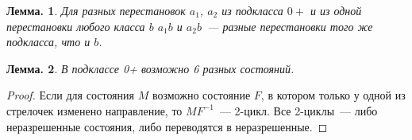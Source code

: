 \documentclass[utf8,russian]{beamer}
\newtheorem{ru_theo}{Лемма.}
\renewenvironment{theorem}{\begin{ru_theo}}{\end{ru_theo}}
\begin{document}

\begin{frame}
\begin{theorem}
Для разных перестановок $a_1$, $a_2$ из подкласса $0+$ и из одной перестановки любого класса $b$ $a_1b$ и $a_2b$~--- разные перестановки того же подкласса, что и $b$.
\end{theorem}
\begin{theorem}
В подклассе 0+ возможно 6 разных состояний.
\end{theorem}
\begin{proof}
Если для состояния $M$ возможно состояние $F$, в котором только у одной из стрелочек изменено направление, то $MF^{-1}$~--- 2-цикл. Все 2-циклы~--- либо неразрешенные состояния, либо переводятся в неразрешенные.


\end{proof}
\end{frame}
\end{document}
